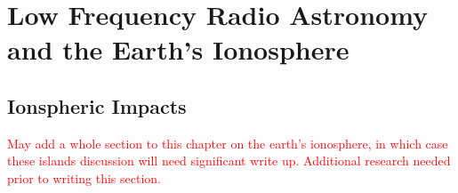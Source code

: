 \chapter{Low Frequency Radio Astronomy and the Earth's Ionosphere}

\section{Ionspheric Impacts}

\textcolor{red}{May add a whole section to this chapter on the earth's ionosphere, in which case these islands discussion will need significant write up. Additional research needed prior to writing this section. }
